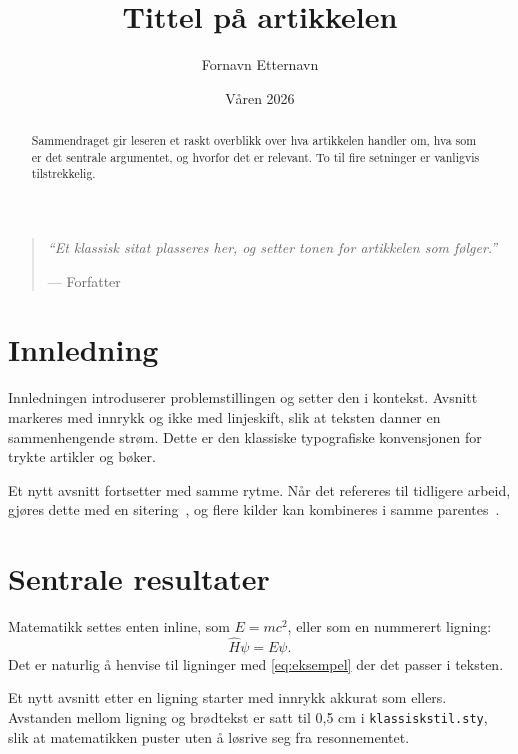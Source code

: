 \documentclass[12pt]{article}
\title{\huge Tittel på artikkelen}
\author{\small Fornavn Etternavn}
\date{Våren 2026}
\begin{document}
{\selectfont\maketitle}     %
\vspace{1cm}

\begin{quote}
  \emph{``Et klassisk sitat plasseres her, og setter tonen for artikkelen
  som følger.''}
  \begin{flushright}
    --- Forfatter
  \end{flushright}
\end{quote}

\begin{abstract}
  \noindent Sammendraget gir leseren et raskt overblikk over hva
  artikkelen handler om, hva som er det sentrale argumentet, og hvorfor
  det er relevant. To til fire setninger er vanligvis tilstrekkelig.
\end{abstract}

\newpage


\section{Innledning}

Innledningen introduserer problemstillingen og setter den i kontekst.
Avsnitt markeres med innrykk og ikke med linjeskift, slik at teksten
danner en sammenhengende strøm. Dette er den klassiske typografiske
konvensjonen for trykte artikler og bøker.

Et nytt avsnitt fortsetter med samme rytme. Når det refereres til
tidligere arbeid, gjøres dette med en sitering~\cite{eksempel2024}, og
flere kilder kan kombineres i samme parentes~\cite{eksempel2024,eksempelbok2020}.


\section{Sentrale resultater}

Matematikk settes enten inline, som $E = mc^2$, eller som en nummerert
ligning:
\begin{equation}
  \hat{H}\psi = E\psi.
  \label{eq:eksempel}
\end{equation}
Det er naturlig å henvise til ligninger med \eqref{eq:eksempel} der det
passer i teksten.

Et nytt avsnitt etter en ligning starter med innrykk akkurat som
ellers. Avstanden mellom ligning og brødtekst er satt til 0,5 cm i
\texttt{klassiskstil.sty}, slik at matematikken puster uten å løsrive
seg fra resonnementet.
\end{document}
